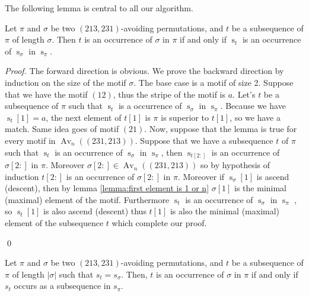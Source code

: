 \documentclass[a4paper]{llncs}
\DeclareMathOperator{\Avd}{Av}
\newcommand\Av[2]{\Avd_{{#1}}({#2})}
\newcommand{\ptext}{\pi}
\newcommand{\pmotif}{\sigma}
\DeclareMathOperator{\stripea}{s}
\newcommand{\stripe}[2]{\stripea_{{#1}}[{#2}]}
\newcommand{\stripew}[1]{\stripea_{{#1}}}
\newcommand{\ustep}{a}
\begin{document}
The following lemma is central to all our algorithm.

\begin{lemma}
\label{lemma:MatchStripeToPermutation}
Let $\pi$ and $\sigma$ be two $(213,231)$-avoiding permutations,
and $t$ be a subsequence of $\pi$ of length $\sigma$.
Then $t$ is an occurrence of $\sigma$ in $\pi$ if and only if
$\stripew{t}$ is an occurrence of $\stripew{\sigma}$ in $\stripew{\pi}$.
\end{lemma}

\begin{proof}
	The forward direction is obvious.
	We prove the backward direction by induction on the size of the motif
	$\sigma$.
	The base case is a motif of size 2. Suppose that we have the motif $(12)$, thus the stripe of the motif is $\ustep$. Let's $t$ be a subsequence of $\ptext$ such that $\stripew{t}$ is a occurrence of $\stripew{\pmotif}$ in $\stripew{\ptext}$. Because we have $\stripe{t}{1}=\ustep$, the next element of $t[1]$ is $\ptext$ is superior to  $t[1]$, so we have a match. Same idea goes of motif $(21)$.
	Now, suppose that the lemma is true for every motif in $\Av{n}{(231,213)}$. Suppose that we have a subsequence $t$ of $\ptext$ such that $\stripew{t}$ is an occurrence of $\stripew{\pmotif}$ in $\stripew{\ptext}$, then $\stripew{t[2:]}$ is an occurrence of $\pmotif[2:]$ in $\ptext$. Moreover
	$\pmotif[2:] \in \Av{n}{(231,213)}$ so by hypothesis of induction $t[2:]$ is an occurrence of $\sigma[2:]$ in $\ptext$.
	Moreover if $\stripe{\pmotif}{1}$ is ascend (descent), then by lemma \ref{lemma:first element is 1 or n} $\pmotif[1]$ is the minimal (maximal) element of the motif. Furthermore $\stripew{t}$ is an occurrence of $\stripew{\pmotif}$ in $\stripew{\ptext}$ , so $\stripe{t}{1}$ is also ascend (descent) thus $t[1]$ is also the minimal (maximal) element of the subsequence $t$ which complete our proof.


\qed
\end{proof}

\begin{lemma}
\label{lemma:MatchStripeToPermutation}
Let $\pi$ and $\sigma$ be two $(213,231)$-avoiding permutations,
and $t$ be a subsequence of $\pi$ of length $|\sigma|$ such that $s_t = s_\sigma$.
Then, $t$ is an occurrence of $\sigma$ in $\pi$ if and only if
$s_t$ occurs as a subsequence in $s_\pi$.
\end{lemma}
\end{document}
